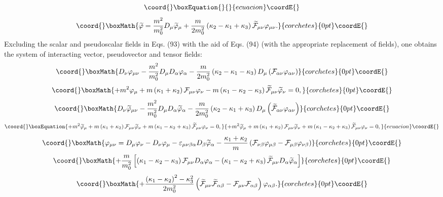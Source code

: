 \documentclass[a4paper,12pt]{article}
\begin{document}
\begin{equation}\coord{}\boxEquation{  \label{94}
}{  }{ecuacion}\coordE{}\end{equation}
\vspace{-7mm}
\[\coord{}\boxMath{
\widetilde{\varphi} =\frac{m^2}{m_0^2}D_\mu
\widetilde{\varphi}_\mu +\frac{m}{2m_0^2}\left(\kappa_2 -\kappa_1
+\kappa_3\right)\widetilde{{\cal F}}_{\mu\nu}\varphi_{\mu\nu} .
}{corchetes}{0pt}\coordE{}\]
Excluding the scalar and pseudoscalar fields in Eqs. (93) with the
aid of Eqs. (94) (with the appropriate replacement of fields), one
obtains the system of interacting vector, pseudovector and tensor
fields:
\[\coord{}\boxMath{
D_\nu \varphi_{\mu\nu} -\frac{m^2}{m_0^2}D_\mu
D_\alpha\varphi_\alpha -\frac{m}{2m_0^2}\left(\kappa_2 -\kappa_1
-\kappa_3\right)D_\mu\left({\cal
F}_{\alpha\nu}\varphi_{\alpha\nu}\right)
}{corchetes}{0pt}\coordE{}\]
\[\coord{}\boxMath{
+m^2\varphi_\mu +m\left(\kappa_1 +\kappa_2 \right){\cal
F}_{\mu\nu}\varphi_{\nu}-m\left(\kappa_1 -\kappa_2 -\kappa_3
\right)\widetilde{{\cal F}}_{\mu\nu}\widetilde{\varphi}_{\nu}=0 ,
}{corchetes}{0pt}\coordE{}\]
\[\coord{}\boxMath{
D_\nu \widetilde{\varphi}_{\mu\nu} -\frac{m^2}{m_0^2}D_\mu
D_\alpha\widetilde{\varphi}_\alpha -\frac{m}{2m_0^2}\left(\kappa_2
-\kappa_1 +\kappa_3\right)D_\mu\left(\widetilde{{\cal
F}}_{\alpha\nu}\varphi_{\alpha\nu}\right)
}{corchetes}{0pt}\coordE{}\]
\begin{equation}\coord{}\boxEquation{
+ m^2 \widetilde{\varphi}_\mu +m\left(\kappa_1 +\kappa_2
\right){\cal F}_{\mu\nu}\widetilde{\varphi}_{\nu}+m\left(\kappa_1
-\kappa_2 +\kappa_3 \right)\widetilde{{\cal
F}}_{\mu\nu}\varphi_{\nu}=0 , \label{95}
}{
+ m^2 \widetilde{\varphi}_\mu +m\left(\kappa_1 +\kappa_2
\right){\cal F}_{\mu\nu}\widetilde{\varphi}_{\nu}+m\left(\kappa_1
-\kappa_2 +\kappa_3 \right)\widetilde{{\cal
F}}_{\mu\nu}\varphi_{\nu}=0 , }{ecuacion}\coordE{}\end{equation}
\[\coord{}\boxMath{
\varphi_{\mu\nu}=D_\mu \varphi_\nu -D_\nu \varphi_\mu
-\varepsilon_{\mu\nu\beta\alpha}D_\beta \widetilde{\varphi}_\alpha
-\frac{\kappa_1 +\kappa_2}{m}\left( {\cal F}_{\nu\beta}\varphi_{
\mu\beta}-{\cal F}_{\mu\beta}\varphi_{ \nu\beta}\right)
}{corchetes}{0pt}\coordE{}\]
\[\coord{}\boxMath{
+\frac{m}{m_0^2}\left[\left( \kappa_1 -\kappa_2
-\kappa_3\right){\cal F}_{\mu\nu }D_\alpha\varphi_\alpha-\left(
\kappa_1 -\kappa_2 +\kappa_3\right)\widetilde{{\cal F}}_{\mu\nu }
D_\alpha\widetilde{\varphi}_\alpha\right]
}{corchetes}{0pt}\coordE{}\]
\[\coord{}\boxMath{
+\frac{\left(\kappa_1 -\kappa_2\right)^2
-\kappa_3^2}{2m_0^2}\left(\widetilde{{\cal F}}_{\mu\nu
}\widetilde{{\cal F}}_{\alpha\beta }-{\cal F}_{\mu\nu }{\cal
F}_{\alpha\beta}\right)\varphi_{\alpha\beta} .
}{corchetes}{0pt}\coordE{}\]
\end{document}
